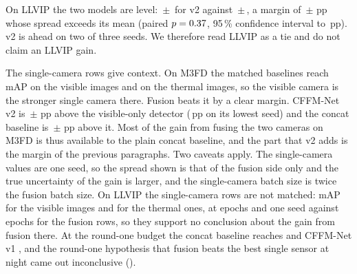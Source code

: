 On LLVIP the two models are level: \resLlvipCffmVtwoMeanMap{}\,$\pm$\,\resLlvipCffmVtwoStdMap{} for v2 against \resLlvipConcatMdMeanMap{}\,$\pm$\,\resLlvipConcatMdStdMap{}, a margin of \marLlvipVtwoVsConcatMdMeanMap{}\,$\pm$\,\marLlvipVtwoVsConcatMdStdMap{}\,pp whose spread exceeds its mean (paired $p=0.37{}$, 95\,\% confidence interval \sigLlvipCiLow{} to \sigLlvipCiHigh{}\,pp). v2 is ahead on two of three seeds. We therefore read LLVIP as a tie and do not claim an LLVIP gain.

The single-camera rows give context. On M3FD the matched baselines reach \resMfdYoloVisSeedZeroMap{} mAP on the visible images and \resMfdYoloThmSeedZeroMap{} on the thermal images, so the visible camera is the stronger single camera there. Fusion beats it by a clear margin. CFFM-Net v2 is \gainMfdCffmVtwoOverBestMeanMap{}\,$\pm$\,\gainMfdCffmVtwoOverBestStdMap{}\,pp above the visible-only detector (\gainMfdCffmVtwoOverBestMinMap{}\,pp on its lowest seed) and the concat baseline is \gainMfdConcatMdOverBestMeanMap{}\,$\pm$\,\gainMfdConcatMdOverBestStdMap{}\,pp above it. Most of the gain from fusing the two cameras on M3FD is thus available to the plain concat baseline, and the part that v2 adds is the margin of the previous paragraphs. Two caveats apply. The single-camera values are one seed, so the spread shown is that of the fusion side only and the true uncertainty of the gain is larger, and the single-camera batch size is twice the fusion batch size. On LLVIP the single-camera rows are not matched: \resLlvipYoloVisSeedZeroMap{} mAP for the visible images and \resLlvipYoloThmSeedZeroMap{} for the thermal ones, at \cfgEpochsPilot{} epochs and one seed against \cfgEpochs{} epochs for the fusion rows, so they support no conclusion about the gain from fusion there. At the round-one budget the concat baseline reaches \resLlvipConcatPlainSeedZeroMap{} and CFFM-Net v1 \resLlvipCffmVoneSeedZeroMap{}, and the round-one hypothesis that fusion beats the best single sensor at night came out inconclusive (\hypPhOneEvidence{}).



